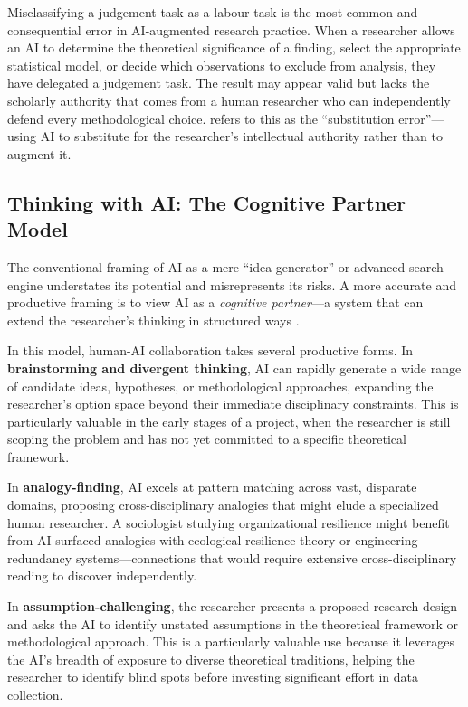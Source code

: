 \documentclass[12pt, a4paper]{article}
\begin{document}
Misclassifying a judgement task as a labour task is the most common and consequential error in AI-augmented research practice. When a researcher allows an AI to determine the theoretical significance of a finding, select the appropriate statistical model, or decide which observations to exclude from analysis, they have delegated a judgement task. The result may appear valid but lacks the scholarly authority that comes from a human researcher who can independently defend every methodological choice. \citet{zyphur2026responsible} refers to this as the ``substitution error''---using AI to substitute for the researcher's intellectual authority rather than to augment it.

\subsection{Thinking with AI: The Cognitive Partner Model}

The conventional framing of AI as a mere ``idea generator'' or advanced search engine understates its potential and misrepresents its risks. A more accurate and productive framing is to view AI as a \textit{cognitive partner}---a system that can extend the researcher's thinking in structured ways \citep{wieland2022electronic, memmert2025effect}.

In this model, human-AI collaboration takes several productive forms. In \textbf{brainstorming and divergent thinking}, AI can rapidly generate a wide range of candidate ideas, hypotheses, or methodological approaches, expanding the researcher's option space beyond their immediate disciplinary constraints. This is particularly valuable in the early stages of a project, when the researcher is still scoping the problem and has not yet committed to a specific theoretical framework.

In \textbf{analogy-finding}, AI excels at pattern matching across vast, disparate domains, proposing cross-disciplinary analogies that might elude a specialized human researcher. A sociologist studying organizational resilience might benefit from AI-surfaced analogies with ecological resilience theory or engineering redundancy systems---connections that would require extensive cross-disciplinary reading to discover independently.

In \textbf{assumption-challenging}, the researcher presents a proposed research design and asks the AI to identify unstated assumptions in the theoretical framework or methodological approach. This is a particularly valuable use because it leverages the AI's breadth of exposure to diverse theoretical traditions, helping the researcher to identify blind spots before investing significant effort in data collection.
\end{document}
